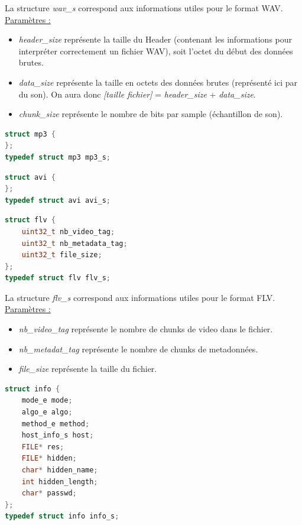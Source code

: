 \documentclass[11pt]{article}
\begin{document}
La structure \textit{wav\_s} correspond aux informations 
utiles pour le format WAV.  
\newline
\underline{Paramètres :}
\begin{itemize}
\item \textit{header\_size} représente la taille du Header (contenant les 
informations pour interpréter correctement un fichier WAV), soit l'octet 
du début des données brutes. 
\item \textit{data\_size} représente la taille en octets des données brutes 
(représenté ici par du son). On aura donc 
\textit{[taille fichier]} = \textit{header\_size} + \textit{data\_size}.
\item \textit{chunk\_size} représente le nombre de bits par sample (échantillon 
de son). 
\newline
\end{itemize}

\begin{lstlisting}[language=c]
struct mp3 {
};
typedef struct mp3 mp3_s;
\end{lstlisting}

\begin{lstlisting}[language=c]
struct avi {
};
typedef struct avi avi_s;
\end{lstlisting}

\begin{lstlisting}[language=c]
struct flv {
	uint32_t nb_video_tag;
	uint32_t nb_metadata_tag;
	uint32_t file_size;
};
typedef struct flv flv_s;
\end{lstlisting}

La structure \textit{flv\_s} correspond aux informations 
utiles pour le format FLV.  
\newline
\underline{Paramètres :}
\begin{itemize}
\item \textit{nb\_video\_tag} représente le nombre de chunks de video dans 
le fichier. 
\item \textit{nb\_metadat\_tag} représente le nombre de chunks de metadonnées. 
\item \textit{file\_size} représente la taille du fichier. 
\newline
\end{itemize}

\begin{lstlisting}[language=c]
struct info {
    mode_e mode;  
    algo_e algo; 
    method_e method;            
    host_info_s host;           
    FILE* res;                 
    FILE* hidden;              
    char* hidden_name;
    int hidden_length; 
    char* passwd;
};
typedef struct info info_s;
\end{lstlisting}
\end{document}
